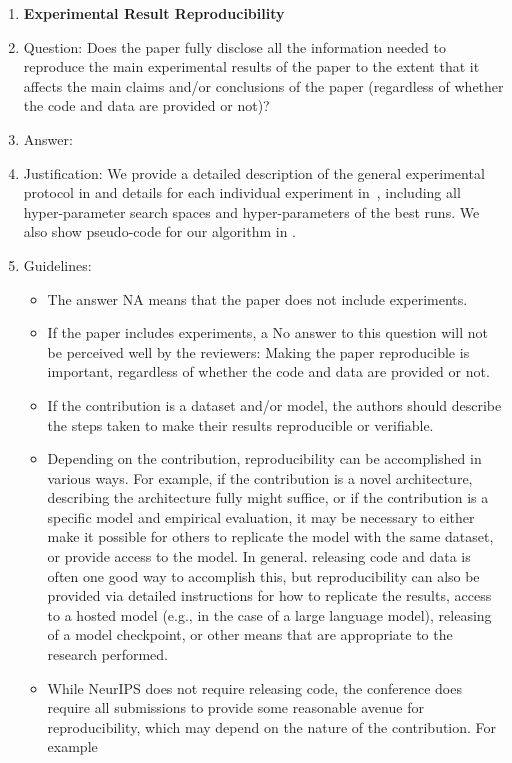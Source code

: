 \begin{enumerate}
\item {\bf Experimental Result Reproducibility}
\item[] Question: Does the paper fully disclose all the information needed to reproduce the main experimental results of the paper to the extent that it affects the main claims and/or conclusions of the paper (regardless of whether the code and data are provided or not)?
\item[] Answer: \answerYes{}
\item[] Justification: We provide a detailed description of the general experimental protocol in  and details for each individual experiment in~, including all hyper-parameter search spaces and hyper-parameters of the best runs. We also show pseudo-code for our algorithm in .
\item[] Guidelines:
  \begin{itemize}
  \item The answer NA means that the paper does not include experiments.
  \item If the paper includes experiments, a No answer to this question will not be perceived well by the reviewers: Making the paper reproducible is important, regardless of whether the code and data are provided or not.
  \item If the contribution is a dataset and/or model, the authors should describe the steps taken to make their results reproducible or verifiable.
  \item Depending on the contribution, reproducibility can be accomplished in various ways. For example, if the contribution is a novel architecture, describing the architecture fully might suffice, or if the contribution is a specific model and empirical evaluation, it may be necessary to either make it possible for others to replicate the model with the same dataset, or provide access to the model. In general. releasing code and data is often one good way to accomplish this, but reproducibility can also be provided via detailed instructions for how to replicate the results, access to a hosted model (e.g., in the case of a large language model), releasing of a model checkpoint, or other means that are appropriate to the research performed.
  \item While NeurIPS does not require releasing code, the conference does require all submissions to provide some reasonable avenue for reproducibility, which may depend on the nature of the contribution. For example
    \begin{enumerate}

\end{enumerate}
\end{itemize}
\end{enumerate}
